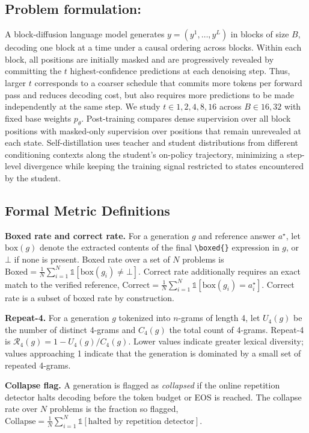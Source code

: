 \documentclass{article}
\begin{document}
\subsection{Problem formulation:} A block-diffusion language model generates $y=(y^1,\dots,y^L)$ in blocks of size $B$, decoding one block at a time under a causal ordering across blocks. Within each block, all positions are initially masked and are progressively revealed by committing the $t$ highest-confidence predictions at each denoising step. Thus, larger $t$ corresponds to a coarser schedule that commits more tokens per forward pass and reduces decoding cost, but also requires more predictions to be made independently at the same step. We study $t\in{1,2,4,8,16}$ across $B\in{16,32}$ with fixed base weights $p_\theta$. Post-training compares dense supervision over all block positions with masked-only supervision over positions that remain unrevealed at each state. Self-distillation uses teacher and student distributions from different conditioning contexts along the student's on-policy trajectory, minimizing a step-level divergence while keeping the training signal restricted to states encountered by the student.


\subsection{Formal Metric Definitions}
\label{sec:metrics}

\textbf{Boxed rate and correct rate.} For a generation $g$ and reference answer $a^\star$, let $\mathrm{box}(g)$ denote the extracted contents of the final \verb|\boxed{}| expression in $g$, or $\bot$ if none is present. Boxed rate over a set of $N$ problems is $\mathrm{Boxed} = \frac{1}{N}\sum_{i=1}^N \mathbb{1}[\mathrm{box}(g_i) \neq \bot]$. Correct rate additionally requires an exact match to the verified reference, $\mathrm{Correct} = \frac{1}{N}\sum_{i=1}^N \mathbb{1}[\mathrm{box}(g_i) = a_i^\star]$. Correct rate is a subset of boxed rate by construction.

\textbf{Repeat-4.} For a generation $g$ tokenized into $n$-grams of length 4, let $U_4(g)$ be the number of distinct 4-grams and $C_4(g)$ the total count of 4-grams. Repeat-4 is $\mathcal{R}_4(g) = 1 - U_4(g)/C_4(g)$. Lower values indicate greater lexical diversity; values approaching 1 indicate that the generation is dominated by a small set of repeated 4-grams.

\textbf{Collapse flag.} A generation is flagged as \emph{collapsed} if the online repetition detector halts decoding before the token budget or EOS is reached. The collapse rate over $N$ problems is the fraction so flagged, $\mathrm{Collapse} = \frac{1}{N}\sum_{i=1}^N \mathbb{1}[\text{halted by repetition detector}]$.
\end{document}
